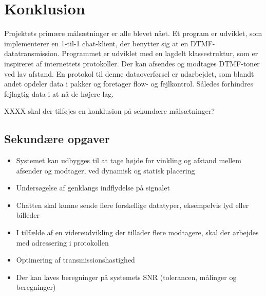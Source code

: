 \section{Konklusion}
Projektets primære målsætninger er alle blevet nået. Et program er udviklet, som implementerer en 1-til-1 chat-klient, der benytter sig at en DTMF-datatransmission. Programmet er udviklet med en lagdelt klassestruktur, som er inspireret af internettets protokoller. Der kan afsendes og modtages DTMF-toner ved lav afstand. En protokol til denne dataoverførsel er udarbejdet, som blandt andet opdeler data i pakker og foretager flow- og fejlkontrol. Således forhindres fejlagtig data i at nå de højere lag.



XXXX skal der tilføjes en konklusion på sekundære målsætninger?
\subsection{Sekundære opgaver}
\begin{itemize}[noitemsep]
\item Systemet kan udbygges til at tage højde for vinkling og afstand mellem afsender og modtager, ved dynamisk og statisk placering
\item Undersøgelse af genklangs indflydelse på signalet
\item Chatten skal kunne sende flere forskellige datatyper, eksempelvis lyd eller billeder
\item I tilfælde af en videreudvikling der tillader flere modtagere, skal der arbejdes med adressering i protokollen
\item Optimering af transmissionshastighed
\item Der kan laves beregninger på systemets SNR (tolerancen, målinger og beregninger)
\end{itemize}